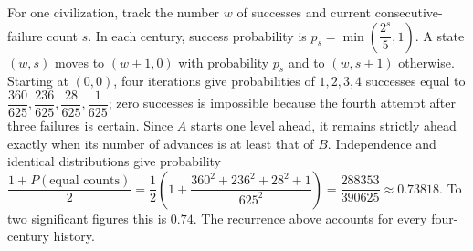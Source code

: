 For one civilization, track the number $w$ of successes and current consecutive-failure count $s$. In each century, success probability is $p_s=\min(\dfrac{2^s}{5},1)$. A state $(w,s)$ moves to $(w+1,0)$ with probability $p_s$ and to $(w,s+1)$ otherwise. Starting at $(0,0)$, four iterations give probabilities of $1,2,3,4$ successes equal to $\dfrac{360}{625},\dfrac{236}{625},\dfrac{28}{625},\dfrac{1}{625}$; zero successes is impossible because the fourth attempt after three failures is certain. Since $A$ starts one level ahead, it remains strictly ahead exactly when its number of advances is at least that of $B$. Independence and identical distributions give probability $\dfrac{1+P(\text{equal counts})}{2}=\dfrac{1}{2}\left(1+\dfrac{360^2+236^2+28^2+1}{625^2}\right)=\dfrac{288353}{390625}\approx0.73818$. To two significant figures this is $\boxed{0.74}$. The recurrence above accounts for every four-century history.

